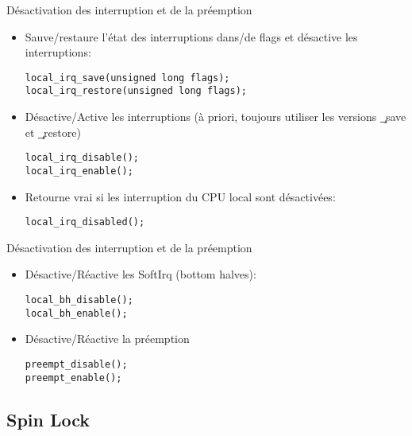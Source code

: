\begin{frame}[fragile=singleslide]{Désactivation des interruption et de la préemption}
    \begin{itemize} 
    \item  Sauve/restaure l'état  des interruptions  dans/de  flags et
      désactive les interruptions:
      \begin{lstlisting} 
local_irq_save(unsigned long flags);
local_irq_restore(unsigned long flags);
      \end{lstlisting} 
    \item  Désactive/Active  les  interruptions  (à  priori,  toujours
      utiliser les versions \c{_save} et \c{_restore})
      \begin{lstlisting} 
local_irq_disable();
local_irq_enable();
      \end{lstlisting} 
    \item  Retourne  vrai  si  les  interruption  du  CPU  local  sont
      désactivées:
      \begin{lstlisting} 
local_irq_disabled();
      \end{lstlisting} 
    \end{itemize}
\end{frame}

\begin{frame}[fragile=singleslide]{Désactivation des interruption et de la préemption}
    \begin{itemize} 
    \item Désactive/Réactive les SoftIrq (bottom halves):
      \begin{lstlisting} 
local_bh_disable();
local_bh_enable();
      \end{lstlisting} 
    \item Désactive/Réactive la préemption
      \begin{lstlisting} 
preempt_disable();
preempt_enable();
      \end{lstlisting} 
    \end{itemize} 
\end{frame} 

\subsection{Spin Lock}

